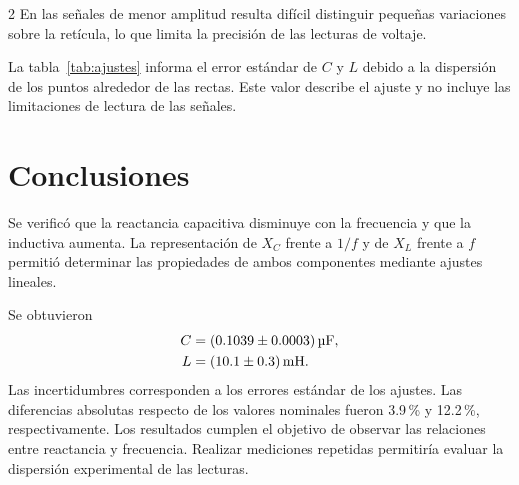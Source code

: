 \documentclass[10pt,letterpaper]{article}
\begin{document}
\begin{multicols}{2}
En las señales de menor amplitud resulta difícil distinguir pequeñas variaciones sobre la retícula, lo que limita la precisión de las lecturas de voltaje.

La tabla~\ref{tab:ajustes} informa el error estándar de $C$ y $L$ debido a la dispersión de los puntos alrededor de las rectas. Este valor describe el ajuste y no incluye las limitaciones de lectura de las señales.

\section{Conclusiones}
Se verificó que la reactancia capacitiva disminuye con la frecuencia y que la inductiva aumenta. La representación de $X_C$ frente a $1/f$ y de $X_L$ frente a $f$ permitió determinar las propiedades de ambos componentes mediante ajustes lineales.

Se obtuvieron
\begin{equation*}
 \begin{aligned}
 C&=(\ResultadoC)\,\si{\micro\farad},\\
 L&=(\ResultadoL)\,\si{\milli\henry}.
 \end{aligned}
\end{equation*}
Las incertidumbres corresponden a los errores estándar de los ajustes. Las diferencias absolutas respecto de los valores nominales fueron \num{3.9}\,\% y \num{12.2}\,\%, respectivamente. Los resultados cumplen el objetivo de observar las relaciones entre reactancia y frecuencia. Realizar mediciones repetidas permitiría evaluar la dispersión experimental de las lecturas.

\nocite{manualhameg,guia4}


\end{multicols}
\end{document}

